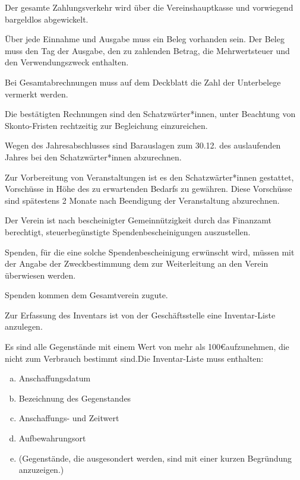 \begin{finanz}
  \label{zahlungsverkehr}

  Der gesamte Zahlungsverkehr wird über die Vereinshauptkasse und vorwiegend bargeldlos abgewickelt.

  Über jede Einnahme und Ausgabe muss ein Beleg vorhanden sein. Der Beleg muss den Tag der Ausgabe, den zu zahlenden Betrag, die Mehrwertsteuer und den Verwendungszweck enthalten.

  Bei Gesamtabrechnungen muss auf dem Deckblatt die Zahl der Unterbelege vermerkt werden.

  Die bestätigten Rechnungen sind den Schatzwärter*innen, unter Beachtung von Skonto-Fristen rechtzeitig zur Begleichung einzureichen.

  Wegen des Jahresabschlusses sind Barauslagen zum 30.12. des auslaufenden Jahres bei den Schatzwärter*innen abzurechnen.

  Zur Vorbereitung von Veranstaltungen ist es den Schatzwärter*innen gestattet, Vorschüsse in Höhe des zu erwartenden Bedarfs zu gewähren. Diese Vorschüsse sind spätestens 2 Monate nach Beendigung der Veranstaltung abzurechnen.


  Der Verein ist nach bescheinigter Gemeinnützigkeit durch das Finanzamt berechtigt, steuerbegünstigte Spendenbescheinigungen auszustellen.

  Spenden, für die eine solche Spendenbescheinigung erwünscht wird, müssen mit der Angabe der Zweckbestimmung dem \name zur Weiterleitung an den Verein überwiesen werden.

  Spenden kommen dem Gesamtverein zugute.


  Zur Erfassung des Inventars ist von der Geschäftsstelle eine Inventar-Liste anzulegen.

  Es sind alle Gegenstände mit einem Wert von mehr als 100\euro aufzunehmen, die nicht zum Verbrauch bestimmt sind.Die Inventar-Liste muss enthalten:
  \begin{enumerate}[(a)]
    \item Anschaffungsdatum
    \item Bezeichnung des Gegenstandes
    \item Anschaffungs- und Zeitwert
    \item Aufbewahrungsort
    \item (Gegenstände, die ausgesondert werden, sind mit einer kurzen Begründung anzuzeigen.)
  \end{enumerate}


\end{finanz}
